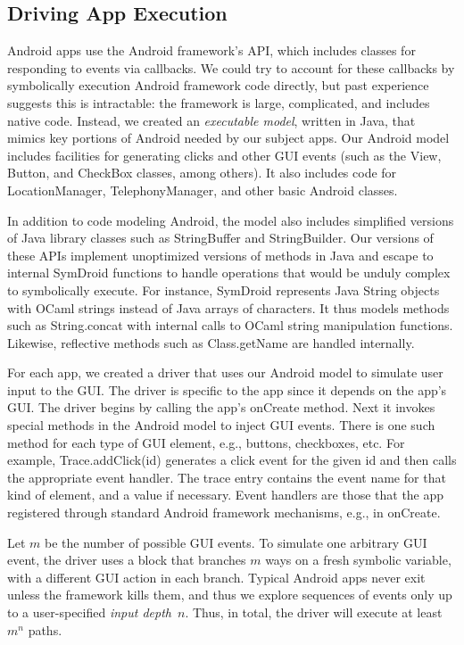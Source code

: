 \documentclass{llncs}
\newcommand{\code}[1]{\textsf{#1}} \newcommand{\bcode}[1]{\texttt{#1}}
\begin{document}
\subsection{Driving App Execution}
\label{sec:driver}

Android apps use the Android framework's API, which includes
classes for responding to events via callbacks. We could try to
account for these callbacks by symbolically execution Android framework code
directly, but past experience suggests this is intractable: the
framework is large, complicated, and includes native code.
Instead, we created an \emph{executable model}, written in Java, that
mimics key portions of Android needed by our subject apps. Our Android
model includes facilities for generating clicks and
other GUI events (such as the \code{View}, \code{Button}, and
\code{CheckBox} classes, among others). It also includes code for
\code{LocationManager},
\code{TelephonyManager}, and other basic Android classes.

In addition to code modeling Android, the model also
includes simplified versions of Java library classes such as
\code{StringBuffer} and \code{StringBuilder}.  Our versions of
these APIs implement unoptimized versions of methods in
Java and escape to internal SymDroid functions to handle operations that
would be unduly complex to symbolically execute. For instance, SymDroid
represents Java \code{String} objects with OCaml strings instead of
Java arrays of characters. It thus models methods such as \code{String.concat}
with internal calls to OCaml string manipulation functions. Likewise,
reflective methods such as \code{Class.getName} are handled internally.

For each app, we created a driver that uses our Android model to simulate user
input to the GUI. The driver is specific to the app since it depends on the
app's GUI.  The driver begins by calling the app's \code{onCreate}
method. 
Next it invokes special
methods in the Android model to inject GUI events. There is one such method for
each type of GUI element, e.g., buttons, checkboxes, etc. 
For example,
\code{Trace.addClick(id)} generates a click event for the given
\code{id} and then calls the appropriate event handler.
The trace entry contains the event name for that kind of element,
and a value if necessary. 
Event handlers are those
that the app registered through standard Android framework mechanisms,
e.g., in \code{onCreate}.

Let $m$ be the number of possible GUI events.  To simulate one
arbitrary GUI event, the driver uses a block that branches $m$ ways on
a fresh symbolic variable, with a different GUI action in each branch.
Typical Android apps never exit unless the framework kills them, and
thus we explore sequences of events only up to a user-specified
\emph{input depth}~$n$. Thus, in total, the driver will execute
at least $m^n$ paths.
\end{document}
